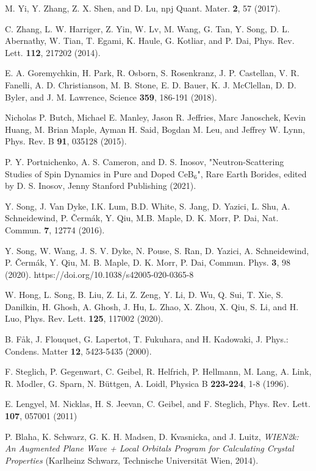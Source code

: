 \documentclass[aps,prl,onecolumn,amsmath,amssymb,superscriptaddress]{revtex4}
\begin{document}
\begin{thebibliography}{}
 M. Yi, Y. Zhang, Z. X. Shen, and D. Lu, npj Quant. Mater. {\bf 2}, 57 (2017).

 C. Zhang, L. W. Harriger, Z. Yin, W. Lv, M. Wang, G. Tan, Y. Song, D. L. Abernathy, W. Tian, T. Egami, K. Haule, G. Kotliar, and P. Dai, Phys. Rev. Lett. {\bf 112}, 217202 (2014).

 E. A. Goremychkin, H. Park, R. Osborn, S. Rosenkranz, J. P. Castellan, V. R. Fanelli, A. D. Christianson, M. B. Stone, E. D. Bauer, K. J. McClellan, D. D. Byler, and J. M. Lawrence, Science {\bf 359}, 186-191 (2018).

Nicholas P. Butch, Michael E. Manley, Jason R. Jeffries, Marc Janoschek, Kevin Huang, M. Brian Maple, Ayman H. Said, Bogdan M. Leu, and Jeffrey W. Lynn, Phys. Rev. B {\bf 91}, 035128 (2015).

 P. Y. Portnichenko, A. S. Cameron, and D. S. Inosov, "Neutron-Scattering Studies of Spin Dynamics in Pure and Doped CeB$_6$", Rare Earth Borides, edited by D. S. Inosov, Jenny Stanford Publishing (2021). 

 Y. Song, J. Van Dyke, I.K. Lum, B.D. White, S. Jang, D. Yazici, L. Shu, A. Schneidewind, P. \v{C}erm\'{a}k, Y. Qiu, M.B. Maple, D. K. Morr, P. Dai, Nat. Commun. {\bf 7}, 12774 (2016).	

 Y. Song, W. Wang, J. S. V. Dyke, N. Pouse, S. Ran, D. Yazici, A. Schneidewind, P. \v{C}erm\'{a}k, Y. Qiu, M. B. Maple, D. K. Morr, P. Dai, Commun. Phys. {\bf 3}, 98 (2020). https://doi.org/10.1038/s42005-020-0365-8


 W. Hong, L. Song, B. Liu, Z. Li, Z. Zeng, Y. Li, D. Wu, Q. Sui, T. Xie, S. Danilkin, H. Ghosh, A. Ghosh, J. Hu, L. Zhao, X. Zhou, X. Qiu, S. Li, and H. Luo, Phys. Rev. Lett. {\bf 125}, 117002 (2020).

 B. F\r{a}k, J. Flouquet, G. Lapertot, T. Fukuhara, and H. Kadowaki, J. Phys.: Condens. Matter {\bf 12}, 5423-5435 (2000).


 F. Steglich, P. Gegenwart, C. Geibel, R. Helfrich, P. Hellmann, M. Lang, A. Link, R. Modler, G. Sparn, N. B\"{u}ttgen, A. Loidl, Physica B {\bf 223-224}, 1-8 (1996).

 E. Lengyel, M. Nicklas, H. S. Jeevan, C. Geibel, and F. Steglich, Phys. Rev. Lett. {\bf 107}, 057001 (2011)

 P. Blaha, K. Schwarz, G. K. H. Madsen, D. Kvasnicka, and J. Luitz, {\it WIEN2k: An Augmented Plane Wave + Local Orbitals Program for Calculating Crystal Properties} (Karlheinz Schwarz, Technische Universit\"{a}t Wien, 2014).


\end{thebibliography}
\end{document}

